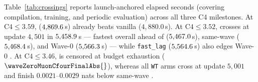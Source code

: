 \begin{enumerate}
  Table~\ref{tab:crossings} reports launch-anchored elapsed seconds (covering
  compilation, training, and periodic evaluation) across all three C4 milestones.
  At $\text{C4}\le 3.59$,  ($4{,}869.6$\,s)
  already beats vanilla  ($4{,}880.0$\,s). At $\text{C4}\le 3.52$,
   crosses at update $4{,}501$ in
  $\sysCrossSymLagThreeFiveTwoS$\,s --- fastest overall ahead of 
  ($5{,}467.0$\,s), same-wave 
  ($5{,}468.4$\,s), and Wave-0 
  ($5{,}566.3$\,s) --- while \texttt{fast\_lag}
   ($5{,}564.6$\,s) also edges Wave-0
  . At $\text{C4}\le 3.46$,  is censored at budget
  exhaustion ($\waveZeroMuonCfourFinalAbs{}$), whereas all \texttt{WT} arms cross
  at update $5{,}001$ and finish $0.0021$--$0.0029$ nats below same-wave
  .
\end{enumerate}

\begin{table}[t]
\centering
\caption{Uncensored launch-anchored elapsed-time crossings ($\text{C4}\le 3.59,
3.52, 3.46$) and full-budget endpoints across eight-A100 runs. Every \texttt{WT}
arm reaches $\text{C4}\le 3.52$ in $250$ fewer updates ($2.36\text{B}$ versus
$2.49\text{B}$ tokens); on \texttt{fast\_lag},  converts that
token saving into the fastest absolute wall-clock crossing
($\sysCrossSymLagThreeFiveTwoS$\,s), while vanilla  is censored at
$\text{C4}\le 3.46$.}
\label{tab:crossings}
\scriptsize\setlength{\tabcolsep}{4.5pt}
\resizebox{\textwidth}{!}{}
\end{table}
